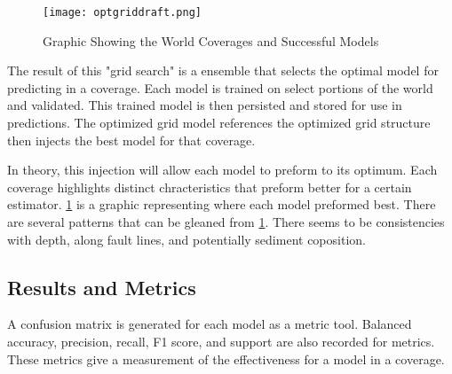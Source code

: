 \begin{figure}[h]
    \centering
    \texttt{[image: optgriddraft.png]}
    \caption{Graphic Showing the World Coverages and Successful Models}
    \label{fig:coveragegrid}
\end{figure}
\par
The result of this "grid search" is a ensemble that selects the optimal model for predicting in a coverage.
Each model is trained on select portions of the world and validated.
This trained model is then persisted and stored for use in predictions.
The optimized grid model references the optimized grid structure then injects the best model for that coverage.

\par
In theory, this injection will allow each model to preform to its optimum.
Each coverage highlights distinct chracteristics that preform better for a certain estimator.
\ref{fig:coveragegrid} is a graphic representing where each model preformed best.
There are several patterns that can be gleaned from \ref{fig:coveragegrid}. 
There seems to be consistencies with depth, along fault lines, and potentially sediment coposition. 


\subsection{Results and Metrics}


\par
A confusion matrix is generated for each model as a metric tool.
Balanced accuracy, precision, recall, F1 score, and support are also recorded for metrics.
These metrics give a measurement of the effectiveness for a model in a coverage.

